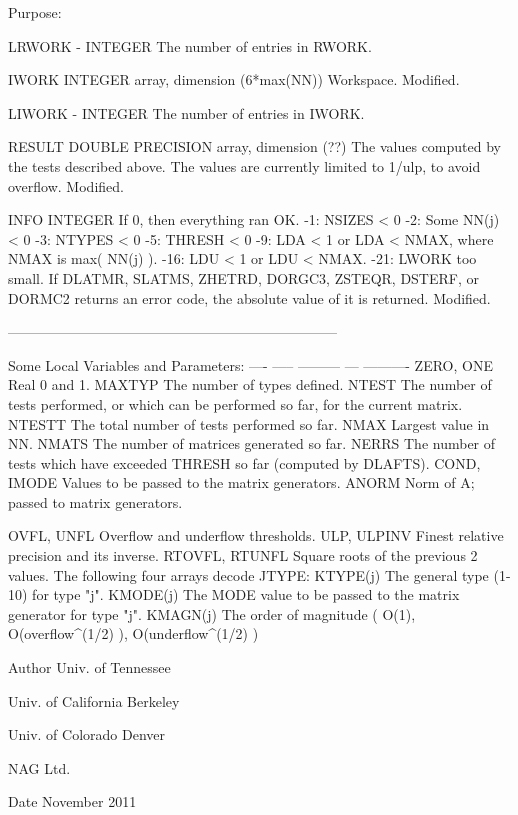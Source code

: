 \begin{DoxyParagraph}{Purpose\+: }
\begin{DoxyVerb}
  LRWORK - INTEGER
           The number of entries in RWORK.

  IWORK   INTEGER array, dimension (6*max(NN))
          Workspace.
          Modified.

  LIWORK - INTEGER
           The number of entries in IWORK.

  RESULT  DOUBLE PRECISION array, dimension (??)
          The values computed by the tests described above.
          The values are currently limited to 1/ulp, to avoid
          overflow.
          Modified.

  INFO    INTEGER
          If 0, then everything ran OK.
           -1: NSIZES < 0
           -2: Some NN(j) < 0
           -3: NTYPES < 0
           -5: THRESH < 0
           -9: LDA < 1 or LDA < NMAX, where NMAX is max( NN(j) ).
          -16: LDU < 1 or LDU < NMAX.
          -21: LWORK too small.
          If  DLATMR, SLATMS, ZHETRD, DORGC3, ZSTEQR, DSTERF,
              or DORMC2 returns an error code, the
              absolute value of it is returned.
          Modified.

-----------------------------------------------------------------------

       Some Local Variables and Parameters:
       ---- ----- --------- --- ----------
       ZERO, ONE       Real 0 and 1.
       MAXTYP          The number of types defined.
       NTEST           The number of tests performed, or which can
                       be performed so far, for the current matrix.
       NTESTT          The total number of tests performed so far.
       NMAX            Largest value in NN.
       NMATS           The number of matrices generated so far.
       NERRS           The number of tests which have exceeded THRESH
                       so far (computed by DLAFTS).
       COND, IMODE     Values to be passed to the matrix generators.
       ANORM           Norm of A; passed to matrix generators.

       OVFL, UNFL      Overflow and underflow thresholds.
       ULP, ULPINV     Finest relative precision and its inverse.
       RTOVFL, RTUNFL  Square roots of the previous 2 values.
               The following four arrays decode JTYPE:
       KTYPE(j)        The general type (1-10) for type "j".
       KMODE(j)        The MODE value to be passed to the matrix
                       generator for type "j".
       KMAGN(j)        The order of magnitude ( O(1),
                       O(overflow^(1/2) ), O(underflow^(1/2) )\end{DoxyVerb}
 
\end{DoxyParagraph}
\begin{DoxyAuthor}{Author}
Univ. of Tennessee 

Univ. of California Berkeley 

Univ. of Colorado Denver 

N\+A\+G Ltd. 
\end{DoxyAuthor}
\begin{DoxyDate}{Date}
November 2011 
\end{DoxyDate}
\hypertarget{group__complex16__eig_gaf5eb53e84bb7255969d88aba73a1dd82}{}
